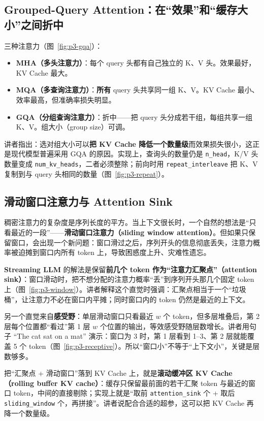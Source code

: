 \subsection{Grouped-Query Attention：在“效果”和“缓存大小”之间折中}

三种注意力（图~\ref{fig:p3-gqa}）：

\begin{itemize}
\item \textbf{MHA（多头注意力）}：每个 query 头都有自己独立的 K、V 头。效果最好，KV Cache 最大。
\item \textbf{MQA（多查询注意力）}：\textbf{所有} query 头共享同一组 K、V。KV Cache 最小、效率最高，但准确率损失明显。
\item \textbf{GQA（分组查询注意力）}：折中——把 query 头分成若干组，每组共享一组 K、V。组大小（group size）可调。
\end{itemize}

讲者指出：选对组大小可以\textbf{把 KV Cache 降低一个数量级}而效果损失很小，这正是现代模型普遍采用 GQA 的原因。实现上，查询头的数量仍是 \texttt{n\_head}，K/V 头数量变成 \texttt{num\_kv\_heads}，二者必须整除；前向时用 \texttt{repeat\_interleave} 把 K、V 复制到与 query 头相同的数量（图~\ref{fig:p3-repeat}）。

\subsection{滑动窗口注意力与 Attention Sink}

稠密注意力的复杂度是序列长度的平方。当上下文很长时，一个自然的想法是“只看最近的一段”——\textbf{滑动窗口注意力（sliding window attention）}。但如果只保留窗口，会出现一个新问题：窗口滑过之后，序列开头的信息彻底丢失，注意力概率被迫摊到窗口内所有 token 上，导致困惑度上升、灾难性遗忘。

\textbf{Streaming LLM} 的解法是保留\textbf{前几个 token 作为“注意力汇聚点”（attention sink）}：窗口滑动时，把不想分配的注意力概率“丢”到序列开头那几个固定 token 上（图~\ref{fig:p3-window}）。讲者解释这个直觉时强调：汇聚点相当于一个“垃圾桶”，让注意力不必在窗口内平摊；同时窗口内的 token 仍然是最近的上下文。

另一个直觉来自\textbf{感受野}：单层滑动窗口只看最近 $w$ 个 token，但多层堆叠后，第 2 层每个位置都“看过”第 1 层 $w$ 个位置的输出，等效感受野随层数增长。讲者用句子 “The cat sat on a mat” 演示：窗口为 3 时，第 1 层看到 1–3、第 2 层就能覆盖 5 个 token（图~\ref{fig:p3-receptive}）。所以“窗口小”不等于“上下文小”，关键是层数够多。

把“汇聚点 + 滑动窗口”落到 KV Cache 上，就是\textbf{滚动缓冲区 KV Cache（rolling buffer KV cache）}：缓存只保留最前面的若干汇聚 token 与最近的窗口 token，中间的直接剔除；实现上就是“取前 \texttt{attention\_sink} 个 + 取后 \texttt{sliding\_window} 个，再拼接”。讲者说配合合适的超参，这可以把 KV Cache 再降一个数量级。

